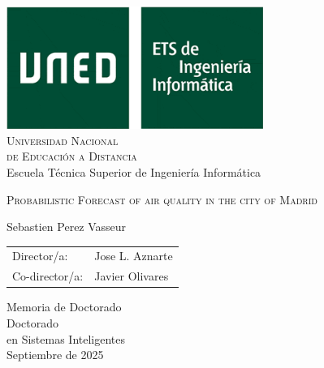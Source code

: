 \begin{titlepage}
\centering
	\includegraphics[height=4cm]{logo_informatica_s.png}\\
	\vspace{0.25cm}
 	{\Large \textsc{{Universidad Nacional\\ de Educación a Distancia}}}\\
 	\vspace{0.8cm}
	{\Large Escuela Técnica Superior de Ingeniería Informática}\\
	\vspace{0.25cm}
	\vspace{1.5cm}
    \begin{spacing}{2}
 	{\textsc{\Huge Probabilistic Forecast of air quality in the city of Madrid}}
    \end{spacing}
	\vfill
	{\Large Sebastien Perez Vasseur}\\
	\vspace{0.3cm}
	\begin{tabular}{ll}
	\large Director/a: & \large Jose L. Aznarte\\
	\vspace{0.3cm}
	\large Co-director/a: & \large Javier Olivares
	\end{tabular}
	
	\vfill
	{\Large Memoria de Doctorado}\\
	\vspace{0.3cm}
	{\large Doctorado\\ en Sistemas Inteligentes}\\
	\vspace{0.25cm}
	Septiembre de 2025
\end{titlepage}